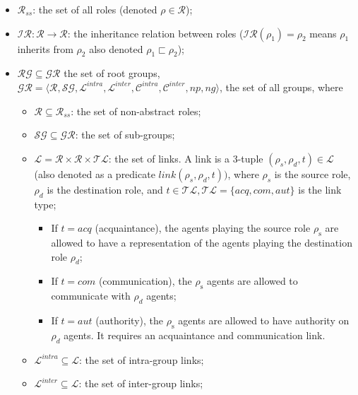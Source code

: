 \documentclass[sn-mathphys-num]{sn-jnl}%
\theoremstyle{thmstyleone}%
\theoremstyle{thmstyletwo}%
\theoremstyle{thmstylethree}%
\begin{document}
\begin{itemize}

    \item $\mathcal{R}_{ss}$: the set of all roles (denoted $\rho \in \mathcal{R}$);

    \item $\mathcal{IR}: \mathcal{R} \rightarrow \mathcal{R}$: the inheritance relation between roles ($\mathcal{IR}(\rho_1) = \rho_2$ means $\rho_1$ inherits from $\rho_2$ also denoted $\rho_1 \sqsubset \rho_2$);

    \item $\mathcal{RG} \subseteq \mathcal{GR}$ the set of root groups, $\mathcal{GR} = \langle \mathcal{R}, \mathcal{SG}, \mathcal{L}^{intra}, \mathcal{L}^{inter}, \mathcal{C}^{intra}, \mathcal{C}^{inter}, np, ng \rangle$, the set of all groups, where

          \begin{itemize}

              \item $\mathcal{R} \subseteq \mathcal{R}_{ss}$: the set of non-abstract roles;

              \item $\mathcal{SG} \subseteq \mathcal{GR}$: the set of sub-groups;

              \item $\mathcal{L} = \mathcal{R} \times \mathcal{R} \times \mathcal{TL}$: the set of links. A link is a 3-tuple $(\rho_s,\rho_d,t) \in \mathcal{L}$ (also denoted as a predicate $link(\rho_s,\rho_d,t))$, where $\rho_{s}$ is the source role, $\rho_{d}$ is the destination role, and $t \in \mathcal{TL}, \mathcal{TL} = \{acq, com, aut\}$ is the link type;
                    \begin{itemize}
                        \item If $t = acq$ (acquaintance), the agents playing the source role $\rho_{\mathrm{s}}$ are allowed to have a representation of the agents playing the destination role $\rho_{d}$;
                        \item If $t = com$ (communication), the $\rho_{\mathrm{s}}$ agents are allowed to communicate with $\rho_{d}$ agents;
                        \item If $t = aut$ (authority), the $\rho_{\mathrm{s}}$ agents are allowed to have authority on $\rho_{d}$ agents. It requires an acquaintance and communication link.
                    \end{itemize}
              \item $\mathcal{L}^{intra} \subseteq \mathcal{L}$: the set of intra-group links;
              \item $\mathcal{L}^{inter} \subseteq \mathcal{L}$: the set of inter-group links;


\end{itemize}
\end{itemize}
\end{document}

